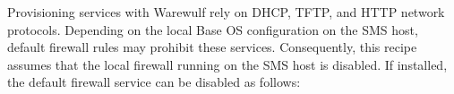Provisioning services with Warewulf rely on DHCP, TFTP, and HTTP network protocols.
Depending on the local Base OS configuration on the SMS host, default firewall
rules may prohibit these services. Consequently, this recipe assumes that the local
firewall running on the SMS host is disabled. If installed, the default
firewall service can be disabled as follows:


